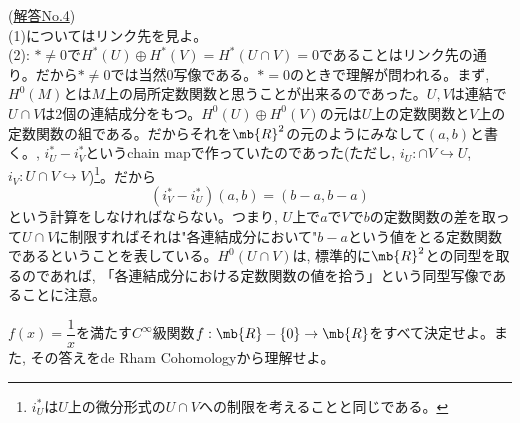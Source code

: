 \begin{egans} (\href{https://www.math.kyoto-u.ac.jp/~iritani/teaching/kaito4.pdf}{解答No.4})\\
(1)についてはリンク先を見よ。\\
(2): $\ast \neq 0$で$H^{\ast}(U)\oplus H^{\ast}(V) = H^{\ast}(U\cap V) = 0$であることはリンク先の通り。だから$\ast\neq 0$では当然0写像である。$\ast = 0$のときで理解が問われる。まず, $H^{0}(M)$とは$M$上の局所定数関数と思うことが出来るのであった。$U,V$は連結で$U\cap V$は2個の連結成分をもつ。$H^{0}(U)\oplus H^{0}(V)$の元は$U$上の定数関数と$V$上の定数関数の組である。だからそれを$\mb{R}^2$の元のようにみなして$(a,b)$と書く。, $i_{U}^{\ast} - i_{V}^{\ast}$というchain mapで作っていたのであった(ただし, $i_U:\cap V\hookrightarrow U$, $i_V:U\cap V\hookrightarrow V$)\footnote{$i_U^{\ast}$は$U$上の微分形式の$U\cap V$への制限を考えることと同じである。}。だから
\[(i_{V}^{\ast} - i_{U}^{\ast})(a,b) = (b-a,b-a)\]
という計算をしなければならない。つまり, $U$上で$a$で$V$で$b$の定数関数の差を取って$U\cap V$に制限すればそれは"各連結成分において"$b-a$という値をとる定数関数であるということを表している。$H^{0}(U\cap V)$は, 標準的に$\mb{R}^2$との同型を取るのであれば, 「各連結成分における定数関数の値を拾う」という同型写像であることに注意。
\end{egans}

\begin{prac}
$f(x)=\dfrac{1}{x}$を満たす$C^{\infty}$級関数$f:\mb{R}-\{ 0 \} \to \mb{R}$をすべて決定せよ。また, その答えをde Rham Cohomologyから理解せよ。
\end{prac}






